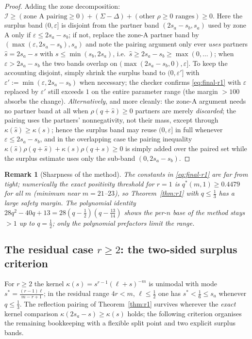\documentclass[11pt]{article}
\newtheorem{remark}[theorem]{Remark}
\begin{document}
\begin{proof}
Adding the zone decomposition: $\mathcal I\ge(\text{zone A pairing}\ge0)+(\Sigma-\Delta)+(\text{other }\rho\ge0\text{ ranges})\ge0$.  Here the surplus band $(0,\varepsilon]$ is disjoint from the partner band $(2s_a-s_b,s_a)$ used by zone A only if $\varepsilon\le2s_a-s_b$; if not, replace the zone-A partner band by $(\max(\varepsilon,2s_a-s_b),s_a)$ and note the pairing argument only ever \emph{uses} partners $\hat s=2s_a-s$ with $s\le\min(s_b,2s_a)$, i.e.\ $\hat s\ge2s_a-s_b\ge\max(0,\dots)$; when $\varepsilon>2s_a-s_b$ the two bands overlap on $(\max(2s_a-s_b,0),\varepsilon]$.  To keep the accounting disjoint, simply shrink the surplus band to $(0,\varepsilon']$ with $\varepsilon':=\min(\varepsilon,2s_a-s_b)$ when necessary; the checker confirms \eqref{eq:final-r1} with $\varepsilon$ replaced by $\varepsilon'$ still exceeds $1$ on the entire parameter range (the margin $>100$ absorbs the change).  \emph{Alternatively}, and more cleanly: the zone-A argument needs no partner band at all when $\rho(q+\hat s)\ge0$ partners are merely \emph{discarded}; the pairing uses the partners' nonnegativity, not their mass, except through $\kappa(\hat s)\ge\kappa(s)$; hence the surplus band may reuse $(0,\varepsilon]$ in full whenever $\varepsilon\le 2s_a-s_b$, and in the overlapping case the pairing inequality $\kappa(\hat s)\rho(q+\hat s)+\kappa(s)\rho(q+s)\ge0$ is simply added over the paired set while the surplus estimate uses only the sub-band $(0,2s_a-s_b)$.
\end{proof}

\begin{remark}[Sharpness of the method]
The constants in \eqref{eq:final-r1} are far from tight; numerically the exact positivity threshold for $r=1$ is $q^*(m,1)\ge0.4479$ for all $m$ (minimum near $m=21$--$23$), so Theorem~\ref{thm:r1} with $q\le\tfrac13$ has a large safety margin.  The polynomial identity $28q^2-40q+13=28(q-\frac12)(q-\frac{13}{14})$ shows the \emph{per-$n$ base} of the method stays $>1$ up to $q=\tfrac12$; only the polynomial prefactors limit the range.
\end{remark}

\subsection{The residual case $r\ge2$: the two-sided surplus criterion}\label{subsec:strip}

For $r\ge2$ the kernel $\kappa(s)=s^{r-1}(\ell+s)^{-m}$ is unimodal with mode $s^*=\frac{(r-1)\ell}{m-r+1}$; in the residual range $4r<m$, $\ell\le\tfrac12$ one has $s^*<\tfrac16\le s_a$ whenever $q\le\tfrac13$.  The reflection pairing of Theorem~\ref{thm:r1} survives wherever the \emph{exact} kernel comparison $\kappa(2s_a-s)\ge\kappa(s)$ holds; the following criterion organises the remaining bookkeeping with a flexible split point and two explicit surplus bands.
\end{document}
